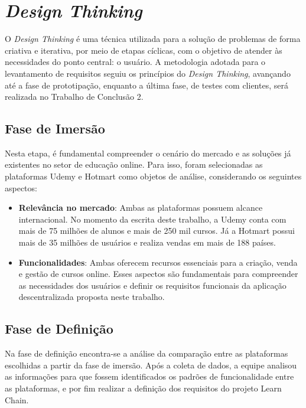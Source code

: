 \section{\textit{Design Thinking}}

O \textit{Design Thinking} é uma técnica utilizada para a solução de problemas de forma criativa e iterativa, por meio de etapas cíclicas, com o objetivo de atender às necessidades do ponto central: o usuário. A metodologia adotada para o levantamento de requisitos seguiu os princípios do \textit{Design Thinking}, avançando até a fase de prototipação, enquanto a última fase, de testes com clientes, será realizada no Trabalho de Conclusão 2.

    \subsection{Fase de Imersão}
    Nesta etapa, é fundamental compreender o cenário do mercado e as soluções já existentes no setor de educação online. Para isso, foram selecionadas as plataformas Udemy e Hotmart como objetos de análise, considerando os seguintes aspectos:

        \begin{itemize}
            \item \textbf{Relevância no mercado}: Ambas as plataformas possuem alcance internacional. No momento da escrita deste trabalho, a Udemy conta com mais de 75 milhões de alunos e mais de 250 mil cursos. Já a Hotmart possui mais de 35 milhões de usuários e realiza vendas em mais de 188 países.
            \item \textbf{Funcionalidades}: Ambas oferecem recursos essenciais para a criação, venda e gestão de cursos online. Esses aspectos são fundamentais para compreender as necessidades dos usuários e definir os requisitos funcionais da aplicação descentralizada proposta neste trabalho.
        \end{itemize}

    \subsection{Fase de Definição}
        Na fase de definição encontra-se a análise da comparação entre as plataformas escolhidas a partir da fase de imersão. Após a coleta de dados, a equipe analisou as informações para que fossem identificados os padrões de funcionalidade entre as plataformas, e por fim realizar a definição dos requisitos do projeto Learn Chain.

